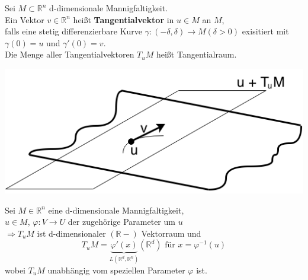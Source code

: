 \begin{definition}
Sei $M \subset \mathbb{R}^n $ d-dimensionale Mannigfaltigkeit. \\
Ein Vektor $v \in \mathbb{R}^n $ heißt \textbf{Tangentialvektor} in $u \in M $ an $M$, \\
falls eine stetig differenzierbare Kurve 
$\gamma: (-\delta, \delta) \rightarrow M (\delta > 0) $ exisitiert mit \\
$\gamma (0) = u $ und $\gamma' (0) = v $. \\
Die Menge aller Tangentialvektoren $T_uM$ heißt Tangentialraum.\\
\begin{center}
\includegraphics[scale=0.5]{pictures/002-04}\\
\end{center}
\end{definition}

\begin{satz}
Sei $M \in \mathbb{R}^n $ eine d-dimensionale Mannigfaltigkeit, \\
$u \in M $, $ \varphi : V \rightarrow U $ der zugehörige Parameter um $u$ \\
$\Longrightarrow T_uM $ ist d-dimensionaler $( \mathbb{R}-) $ Vektorraum und \\
    \begin{equation}
    T_uM = \underbrace{\varphi'(x)}_{L \left( \mathbb{R}^d, \mathbb{R}^n \right) }
    \left( \mathbb{R}^d \right) \text{ für } x = \varphi^{-1} (u) 
    \end{equation}
wobei $T_uM$ unabhängig vom speziellen Parameter $\varphi$ ist.
\end{satz}

